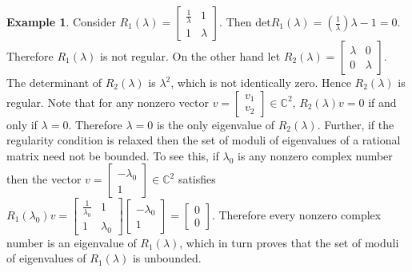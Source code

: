 \documentclass[12pt, reqno]{amsart}
\theoremstyle{definition}
\newtheorem{example}[theorem]{Example}
\theoremstyle{remark}
\numberwithin{equation}{section}
\begin{document}
\begin{example}
Consider $R_1(\lambda)= \begin{bmatrix}
\frac{1}{\lambda} & 1 \\
1 & \lambda
\end{bmatrix}$. Then $\text{det}R_1(\lambda)= 
(\frac{1}{\lambda}) \lambda -1 =0$. Therefore $R_1(\lambda)$ is not regular. On 
the other hand let $R_2(\lambda)= \begin{bmatrix}
\lambda & 0 \\
0 & \lambda
\end{bmatrix}$. The determinant of $R_2(\lambda)$ is $\lambda^2$, which is not 
identically zero. Hence $R_2(\lambda)$ is regular. Note that for any nonzero vector 
$v =\begin{bmatrix}
v_1 \\
v_2
\end{bmatrix} \in \mathbb{C}^2$, $R_2(\lambda)v=0$ if and only if $\lambda = 0$. 
Therefore $\lambda = 0$ is the only eigenvalue of $R_2(\lambda)$. Further, if the 
regularity condition is relaxed then the set of moduli of eigenvalues of a rational 
matrix need not be bounded. To see this, if $\lambda_0$ is any nonzero complex number 
then the vector $v =\begin{bmatrix}
-\lambda_0 \\
1
\end{bmatrix} \in \mathbb{C}^2$ satisfies $R_1(\lambda_0)v= \begin{bmatrix}
\frac{1}{\lambda_0} & 1 \\
1 & \lambda_0
\end{bmatrix} \begin{bmatrix}
-\lambda_0 \\
1
\end{bmatrix} = \begin{bmatrix}
0 \\
0
\end{bmatrix}$. Therefore every nonzero complex number is an eigenvalue of $R_1(\lambda)$,
which in turn proves that the set of moduli of eigenvalues of $R_1(\lambda)$ is 
unbounded.
\end{example} 
\end{document}
